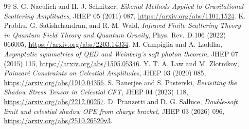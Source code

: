 \documentclass[11pt]{article}
\theoremstyle{remark}\newtheorem{remark}[theorem]{Remark}
\begin{document}
\begin{thebibliography}{99}
 S. G. Naculich and H. J. Schnitzer, \emph{Eikonal Methods Applied to Gravitational Scattering Amplitudes}, JHEP 05 (2011) 087, \url{https://arxiv.org/abs/1101.1524}.
 K. Prabhu, G. Satishchandran, and R. M. Wald, \emph{Infrared Finite Scattering Theory in Quantum Field Theory and Quantum Gravity}, Phys. Rev. D 106 (2022) 066005, \url{https://arxiv.org/abs/2203.14334}.
 M. Campiglia and A. Laddha, \emph{Asymptotic symmetries of QED and Weinberg's soft photon theorem}, JHEP 07 (2015) 115, \url{https://arxiv.org/abs/1505.05346}.
 Y. T. A. Law and M. Zlotnikov, \emph{Poincar\'e Constraints on Celestial Amplitudes}, JHEP 03 (2020) 085, \url{https://arxiv.org/abs/1910.04356}.
 S. Banerjee and S. Pasterski, \emph{Revisiting the Shadow Stress Tensor in Celestial CFT}, JHEP 04 (2023) 118, \url{https://arxiv.org/abs/2212.00257}.
 D. Pranzetti and D. G. Salluce, \emph{Double-soft limit and celestial shadow OPE from charge bracket}, JHEP 03 (2026) 096, \url{https://arxiv.org/abs/2510.26520v3}.
\end{thebibliography}
\end{document}
